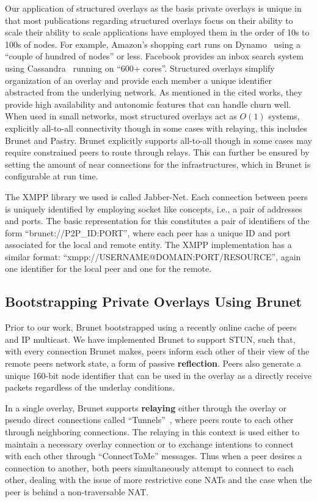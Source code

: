 \documentclass[conference]{IEEEtran}
\begin{document}
Our application of structured overlays as the basis private overlays is unique
in that most publications regarding structured overlays focus on their ability
to scale their ability to scale applications have employed them in the order of
10s to 100s of nodes.  For example, Amazon's shopping cart runs on
Dynamo~\cite{dynamo} using a ``couple of hundred of nodes'' or less.  Facebook
provides an inbox search system using Cassandra~\cite{cassandra} running on
``600+ cores''.  Structured overlays simplify organization of an overlay and
provide each member a unique identifier abstracted from the underlying network.
As mentioned in the cited works, they provide high availability and autonomic
features that can handle churn well.  When used in small networks, most
structured overlays act as $O(1)$ systems, explicitly all-to-all connectivity
though in some cases with relaying, this includes Brunet and Pastry.  Brunet
explicitly supports all-to-all though in some cases may require constrained
peers to route through relays.  This can further be ensured by setting the
amount of near connections for the infrastructures, which in Brunet is
configurable at run time.

The XMPP library we used is called Jabber-Net.  Each connection between peers
is uniquely identified by employing socket like concepts, i.e., a pair of
addresses and ports.  The basic representation for this constitutes a pair of
identifiers of the form ``brunet://P2P\_ID:PORT'', where each peer has a unique
ID and port associated for the local and remote entity.  The XMPP
implementation has a similar format: ``xmpp://USERNAME@DOMAIN:PORT/RESOURCE'',
again one identifier for the local peer and one for the remote.

\subsection{Bootstrapping Private Overlays Using Brunet}
\label{brunet_bootstrapping}

Prior to our work, Brunet bootstrapped using a recently online cache of peers
and IP multicast.  We have implemented Brunet to support STUN, such that, with
every connection Brunet makes, peers inform each other of their view of the
remote peers network state, a form of passive \textbf{reflection}.  Peers also
generate a unique 160-bit node identifier that can be used in the overlay as a
directly receive packets regardless of the underlay conditions.

In a single overlay, Brunet supports \textbf{relaying} either through the
overlay or pseudo direct connections called ``Tunnels''~\cite{hpdc08_0}, where
peers route to each other through neighboring connections.  The relaying in
this context is used either to maintain a necessary overlay connection or to
exchange intentions to connect with each other through ``ConnectToMe''
messages.  Thus when a peer desires a connection to another, both peers
simultaneously attempt to connect to each other, dealing with the issue of more
restrictive cone NATs and the case when the peer is behind a non-traversable
NAT.  
\end{document}
